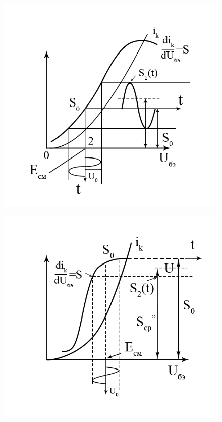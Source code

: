 \begin{center}
    \begin{figure}[H]
        \vspace{-10pt}
        \begin{minipage}{0.49\linewidth}
            \includegraphics[width=\linewidth]{circuit/fig4a} 
            \vspace{-50pt}
            \label{fig:4a}
        \end{minipage}
    \begin{minipage}{0.49\linewidth}
        \includegraphics[width=\linewidth]{circuit/fig4b} 
        \vspace{-50pt}
        \label{fig:4b}
    \end{minipage}
    \caption{}
    \vspace{-40pt}
    \label{fig:4}
    \end{figure}
\end{center} 

